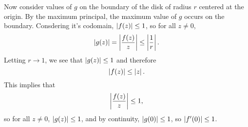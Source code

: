 \documentclass{homework}
\begin{document}
\begin{solution}
                                                                                                                                                                                                                                                                  Now consider values of $g$ on the boundary of the disk of radius $r$ centered at the origin. By the maximum principal, the maximum value of $g$ occurs on the boundary. Consdering it's codomain, $\left|f(z)\right| \leq 1$, so for all $z\neq 0$,
                                                                                                                                                                                                                                                                  \[
                                                                                                                                                                                                                                                                  \left|g(z)\right| = \left|\frac{f(z)}{z}\right| \leq \left|\frac{1}{r}\right|.
                                                                                                                                                                                                                                                                  \]
                                                                                                                                                                                                                                                                  Letting $r\to 1$, we see that $\left|g(z)\right|\leq 1$ and therefore \[\left|f(z)\right| \leq \left|z\right|.\]
                                                                                                                                                                                                                                                                  This implies that
                                                                                                                                                                                                                                                                  \[\left|\frac{f(z)}{z}\right| \leq 1,\]
                                                                                                                                                                                                                                                                  so for all $z\neq 0$, $\left|g(z)\right|\leq 1$, and by continuity, $\left|g(0)\right|\leq 1$, so $\left|f'(0)\right|\leq 1$.
                                                                                                                                                                                                                                                                  \end{solution}
\end{document}
